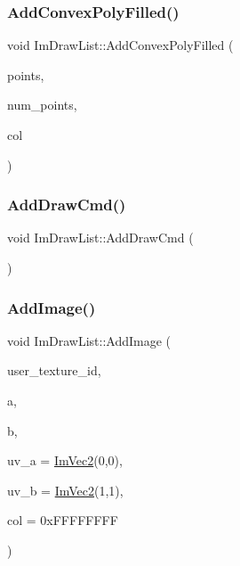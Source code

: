 \subsubsection{\texorpdfstring{Add\+Convex\+Poly\+Filled()}{AddConvexPolyFilled()}}
{\footnotesize\ttfamily void Im\+Draw\+List\+::\+Add\+Convex\+Poly\+Filled (\begin{DoxyParamCaption}\item[{const \mbox{\hyperlink{struct_im_vec2}{Im\+Vec2}} $\ast$}]{points,  }\item[{const int}]{num\+\_\+points,  }\item[{\mbox{\hyperlink{imgui_8h_a118cff4eeb8d00e7d07ce3d6460eed36}{Im\+U32}}}]{col }\end{DoxyParamCaption})}

\mbox{\label{struct_im_draw_list_a846714bb0321c6f1f908767abc8559e6}} 
\subsubsection{\texorpdfstring{Add\+Draw\+Cmd()}{AddDrawCmd()}}
{\footnotesize\ttfamily void Im\+Draw\+List\+::\+Add\+Draw\+Cmd (\begin{DoxyParamCaption}{ }\end{DoxyParamCaption})}

\mbox{\label{struct_im_draw_list_ac37cd998bf5f40705c7445004a029b66}} 
\subsubsection{\texorpdfstring{Add\+Image()}{AddImage()}}
{\footnotesize\ttfamily void Im\+Draw\+List\+::\+Add\+Image (\begin{DoxyParamCaption}\item[{\mbox{\hyperlink{imgui_8h_a364f4447ecbc4ca176145ccff9db6286}{Im\+Texture\+ID}}}]{user\+\_\+texture\+\_\+id,  }\item[{const \mbox{\hyperlink{struct_im_vec2}{Im\+Vec2}} \&}]{a,  }\item[{const \mbox{\hyperlink{struct_im_vec2}{Im\+Vec2}} \&}]{b,  }\item[{const \mbox{\hyperlink{struct_im_vec2}{Im\+Vec2}} \&}]{uv\+\_\+a = {\ttfamily \mbox{\hyperlink{struct_im_vec2}{Im\+Vec2}}(0,0)},  }\item[{const \mbox{\hyperlink{struct_im_vec2}{Im\+Vec2}} \&}]{uv\+\_\+b = {\ttfamily \mbox{\hyperlink{struct_im_vec2}{Im\+Vec2}}(1,1)},  }\item[{\mbox{\hyperlink{imgui_8h_a118cff4eeb8d00e7d07ce3d6460eed36}{Im\+U32}}}]{col = {\ttfamily 0xFFFFFFFF} }\end{DoxyParamCaption})}

